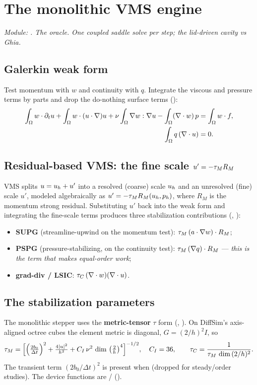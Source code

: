 \chapter{The monolithic VMS engine}
\label{ch:c1}

\emph{Module: . The oracle. One coupled saddle
solve per step; the lid-driven cavity vs Ghia.}

\section{Galerkin weak form}
Test momentum with $w$ and continuity with $q$. Integrate the viscous and
pressure terms by parts and drop the do-nothing surface terms
():
\begin{align}
\int_\Omega w\cdot\partial_t u + \int_\Omega w\cdot(u\cdot\nabla)u
  + \nu\int_\Omega \nabla w:\nabla u - \int_\Omega (\nabla\cdot w)\,p &= \int_\Omega w\cdot f,\\
\int_\Omega q\,(\nabla\cdot u) &= 0.
\end{align}

\section{Residual-based VMS: the fine scale $u' = -\tau_M R_M$}
VMS splits $u=u_h+u'$ into a resolved (coarse) scale $u_h$ and an
unresolved (fine) scale $u'$, modeled algebraically as $u'=-\tau_M
R_M(u_h,p_h)$, where $R_M$ is the momentum strong residual. Substituting
$u'$ back into the weak form and integrating the fine-scale terms produces
three stabilization contributions (,
):
\begin{itemize}
\item \textbf{SUPG} (streamline-upwind on the momentum test):
  $\tau_M\,(a\cdot\nabla w)\cdot R_M$;
\item \textbf{PSPG} (pressure-stabilizing, on the continuity test):
  $\tau_M\,(\nabla q)\cdot R_M$ --- \emph{this is the term that makes
  equal-order work};
\item \textbf{grad-div / LSIC}: $\tau_C\,(\nabla\cdot w)(\nabla\cdot u)$.
\end{itemize}

\section{The stabilization parameters}
The monolithic stepper uses the \textbf{metric-tensor} $\tau$ form
(, ). On DiffSim's axis-aligned
octree cubes the element metric is diagonal, $G=(2/h)^2 I$, so
\begin{equation}
\tau_M = \Big[\Big(\tfrac{2b_0}{\Delta t}\Big)^2 + \tfrac{4|u|^2}{h^2}
  + C_I\,\nu^2\,\dim\,\big(\tfrac{2}{h}\big)^4\Big]^{-1/2},\quad C_I=36,
\qquad
\tau_C = \frac{1}{\tau_M\,\dim\,(2/h)^2}.
\end{equation}
The transient term $(2b_0/\Delta t)^2$ is present when 
(dropped for steady/order studies). The device functions are
 /  ().

